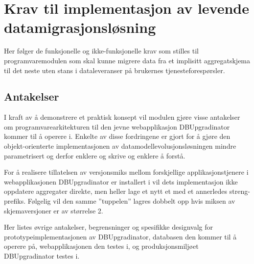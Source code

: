 \section{Krav til implementasjon av levende datamigrasjonsløsning}

Her følger de funksjonelle og ikke-funksjonelle krav som stilles til programvaremodulen som skal kunne migrere data fra et implisitt aggregatskjema til det neste uten stans i dataleveranser på brukernes tjenesteforespørsler.

\subsection{Antakelser}

I kraft av å demonstrere et praktisk konsept vil modulen gjøre visse antakelser om programvarearkitekturen til den jevne webapplikasjon DBUpgradinator kommer til å operere i. Enkelte av disse fordringene er gjort for å gjøre den objekt-orienterte implementasjonen av datamodellevolusjonsløsningen mindre parametrisert og derfor enklere og skrive og enklere å forstå.

For å realisere tillatelsen av versjonsmiks mellom forskjellige applikasjonstjenere i webapplikasjonen DBUpgradinator er installert i vil dets implementasjon ikke oppdatere aggregater direkte, men heller lage et nytt et med et annerledes streng-prefiks. Følgelig vil den samme ''tuppelen'' lagres dobbelt opp hvis miksen av skjemaversjoner er av størrelse 2.

Her listes øvrige antakelser, begrensninger og spesifikke designvalg for prototypeimplementasjonen av DBUpgradinator, databasen den kommer til å operere på, webapplikasjonen den testes i, og produksjonsmiljøet DBUpgradinator testes i.

